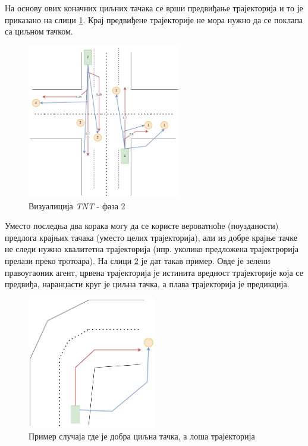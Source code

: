 \documentclass[11pt,oneside]{memoir}
\begin{document}
На основу ових коначних циљних тачака се врши предвиђање трајекторија и то је приказано на слици \ref{tnt-viz-2}. Крај предвиђене трајекторије не мора
нужно да се поклапа са циљном тачком.

\begin{figure}[H]
  \centering
  \includegraphics[width=0.6\textwidth]{images/tnt-viz-Page-2.drawio.png}
  \caption{Визуалиција \textit{TNT} - фаза 2 \label{tnt-viz-2}}
\end{figure}

Уместо последња два корака могу да се користе вероватноће (поузданости) предлога крајњих тачака (уместо целих трајекторија),
али из добре крајње тачке не следи
нужно квалитетна трајекторија (нпр. уколико предложена трајектрорија прелази преко тротоара). На слици \ref{tnt-good-target-bad-traj}
је дат такав пример. Овде је зелени правоугаоник агент, црвена трајекторија је истинита вредност трајекторије која се предвиђа, 
наранџасти круг је циљна тачка, а плава трајекторија је предикција. 

\begin{figure}[H]
  \centering
  \includegraphics[width=0.5\textwidth]{images/tnt-good-end-point-and-bad-traj.drawio.png}
  \caption{Пример случаја где је добра циљна тачка, а лоша трајекторија \label{tnt-good-target-bad-traj}}
\end{figure}
\end{document}
